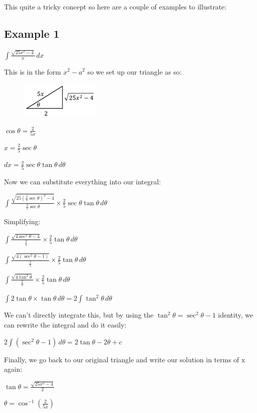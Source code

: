 \documentclass[../main.tex]{subfiles}
\begin{document}
    This quite a tricky concept so here are a couple of examples to illustrate:

    \subsection*{Example 1}
    \(\int \frac{\sqrt{25x^2-4}}{x}\,dx\)

    This is in the form \(x^2-a^2\) so we set up our triangle as so:
    \begin{figure}[h]
        \centering
        \includegraphics{images/trigsub4.png}
    \end{figure}

    \(\cos{\theta}=\frac{2}{5x}\)

    \(x=\frac{2}{5}\sec{\theta}\)

    \(dx=\frac{2}{5}\sec{\theta}\tan{\theta}\,d\theta\)

    Now we can substitute everything into our integral:

    \(\int \frac{\sqrt{25(\frac{2}{5}\sec{\theta})^2-4}}{\frac{2}{5}\sec{\theta}}\times \frac{2}{5}\sec{\theta}\tan{\theta}\,d\theta\)

    Simplifying:

    \(\int \frac{\sqrt{4\sec^2{\theta}-4}}{\frac{2}{5}}\times \frac{2}{5}\tan{\theta}\,d\theta\)

    \(\int \frac{\sqrt{4(\sec^2{\theta}-1)}}{\frac{2}{5}}\times \frac{2}{5}\tan{\theta}\,d\theta\)

    \(\int \frac{\sqrt{4\tan^2{\theta}}}{\frac{2}{5}}\times \frac{2}{5}\tan{\theta}\,d\theta\)

    \(\int 2\tan{\theta}\times \tan{\theta}\,d\theta=2\int \tan^2{\theta}\,d\theta\)

    We can’t directly integrate this, but by using the \(\tan^2{\theta}=\sec^2{\theta}-1\) identity, we can rewrite the integral and do it easily:

    \(2\int (\sec^2{\theta}-1)\,d\theta=2\tan{\theta}-2\theta+c\)

    Finally, we go back to our original triangle and write our solution in terms of x again:

    \(\tan{\theta}=\frac{\sqrt{25x^2-4}}{2}\)

    \(\theta=\cos^{-1}{(\frac{2}{5x})}\)
\end{document}

